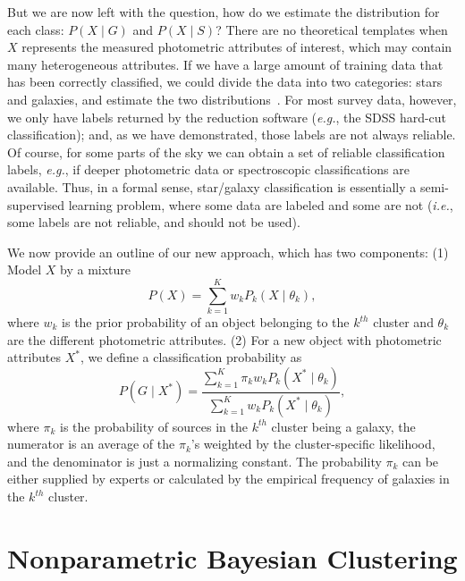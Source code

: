 But we are now left with the question, how do we estimate the distribution for each class: $P(X \mid G)$ and $P(X \mid S)$? There are no theoretical templates when $X$ represents the measured photometric attributes of interest, which may contain many heterogeneous attributes. If we have a large amount of training data that has been correctly classified, we could divide the data into two categories: stars and galaxies, and estimate the two distributions~\citep[\textit{e.g.},][]{fadely12}. For most survey data, however, we only have labels returned by the reduction software (\textit{e.g.}, the SDSS hard-cut classification); and, as we have demonstrated, those labels are not always reliable. Of course, for some parts of the sky we can obtain a set of reliable classification labels, \textit{e.g.}, if deeper photometric data or spectroscopic classifications are available. Thus, in a formal sense, star/galaxy classification  is essentially a semi-supervised learning problem, where some data  are labeled and some are not (\textit{i.e.}, some labels are not reliable, and should not be used). 

We now provide an outline of our new approach, which has two components:  (1) Model $X$ by a mixture 
\[ P(X) = \sum_{k=1}^K w_k P_k (X \mid \theta_k), \]
where $w_k$ is the prior probability of an object belonging to the $k^{th}$ cluster and $\theta_k$ are the different photometric attributes. (2) For a new object with photometric attributes $X^*$, we define a classification probability as
\[ P(G \mid X^*) = \frac{\sum_{k=1}^K \pi_k w_k P_k (X^* \mid \theta_k)}{\sum_{k=1}^K w_k P_k( X^* \mid \theta_k)}, \]
where $\pi_k$ is the probability of sources in the $k^{th}$ cluster being a galaxy, the numerator is an average of the $\pi_k$'s weighted by the cluster-specific likelihood, and the denominator is just a normalizing constant. The probability $\pi_k$ can be either supplied by experts or calculated by the empirical frequency of galaxies in the $k^{th}$ cluster. 

\section{Nonparametric Bayesian Clustering}

